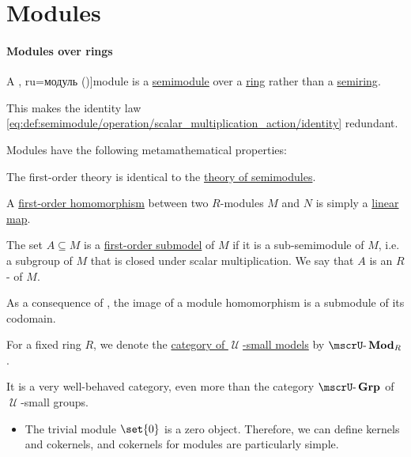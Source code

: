 \section{Modules}\label{sec:modules}

\paragraph{Modules over rings}

\begin{definition}\label{def:module}
  A \term[bg=модул (\cite[27]{КоцевСидеров2016КомАлгебра}, ru=модуль (\cite[def. 9.3.1]{Винберг2014Алгебра})]{module} is a \hyperref[def:semimodule]{semimodule} over a \hyperref[def:ring]{ring} rather than a \hyperref[def:semiring]{semiring}.

  This makes the identity law \eqref{eq:def:semimodule/operation/scalar_multiplication_action/identity} redundant.

  Modules have the following metamathematical properties:
  \begin{thmenum}
    \mimprovised The first-order theory is identical to the \hyperref[def:semimodule/theory]{theory of semimodules}.

     A \hyperref[def:first_order_homomorphism]{first-order homomorphism} between two \( R \)-modules \( M \) and \( N \) is simply a \hyperref[def:linear_function]{linear map}.

     The set \( A \subseteq M \) is a \hyperref[def:first_order_submodel]{first-order submodel} of \( M \) if it is a sub-semimodule of \( M \), i.e. a subgroup of \( M \) that is closed under scalar multiplication. We say that \( A \) is an \( R \)- of \( M \).

    As a consequence of , the image of a module homomorphism is a submodule of its codomain.

    \mimprovised For a fixed ring \( R \), we denote the \hyperref[def:category_of_small_first_order_models]{category of \( \mscrU \)-small models} by \( \ucat{Mod}_R \).

    It is a very well-behaved category, even more than the category \hyperref[def:group/category]{\( \ucat{Grp} \)} of \( \mscrU \)-small groups.
    \begin{itemize}
      \item The trivial module \( \set{ 0 } \) is a zero object. Therefore, we can define kernels and cokernels, and cokernels for modules are particularly simple.


\end{itemize}
\end{thmenum}
\end{definition}
